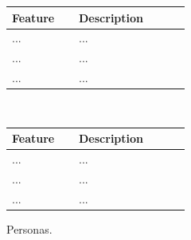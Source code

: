 \documentclass[../report.tex]{subfiles}
\begin{document}
\begin{figure}
\def\arraystretch{1.5}
\centering
\begin{tabular}{|p{0.3\linewidth}|p{0.5\linewidth}|}
\hline
Feature & Description \\
\hline
... & ... \\ 
... & ... \\ 
... & ... \\ 
\hline
\end{tabular}
\vspace{0.5cm} \\
\begin{tabular}{|p{0.3\linewidth}|p{0.5\linewidth}|}
\hline
Feature & Description \\
\hline
... & ... \\ 
... & ... \\ 
... & ... \\ 
\hline
\end{tabular}
\caption{Personas.}
\label{fig:personas}
\end{figure}
\end{document}
